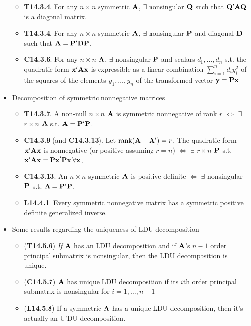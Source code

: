 \documentclass[a4paper, oneside]{book}
\begin{document}
\begin{itemize}
	\begin{itemize}
	\item \textbf{T14.3.4}. For any $n\times n$ symmetric $\mathbf{A}$, $\exists$ nonsingular $\mathbf{Q}$ such that $\mathbf{Q'AQ}$ is a diagonal matrix.
	\item \textbf{T14.3.4}. For any $n\times n$ symmetric $\mathbf{A}$, $\exists$ nonsingular $\mathbf{P}$ and diagonal $\mathbf{D}$ such that $\mathbf{A}=\mathbf{P'DP}$.
	\item \textbf{C14.3.6}. For any $n\times n$ $\mathbf{A}$, $\exists$ nonsingular $\mathbf{P}$ and scalars $d_1, \hdots, d_n$ s.t. the quadratic form $\mathbf{x'Ax}$ is expressible as a linear combination $\sum_{i=1}^n d_i y_i^2$ of the squares of the elements $y_1, \hdots, y_n$ of the transformed vector $\mathbf{y=Px}$
	\end{itemize}
\item Decomposition of symmetric nonnegative matrices
	\begin{itemize}
	\item \textbf{T14.3.7}. A non-null $n\times n$ $\mathbf{A}$ is symmetric nonnegative of rank $r$ $\iff$ $\exists$ $r\times n$ $\mathbf{A}$ s.t. $\mathbf{A}=\mathbf{P'P}$.
	\item \textbf{C14.3.9} (and \textbf{C14.3.13}). Let $\text{rank}(\mathbf{A+A'}) = r$. The quadratic form $\mathbf{x'Ax}$ is nonnegative (or positive assuming $r=n$) $\iff$ $\exists$ $r\times n$ $\mathbf{P}$ s.t. $\mathbf{x'Ax}=\mathbf{Px}'\mathbf{Px}\, \forall \mathbf{x}$. 
	\item \textbf{C14.3.13}. An $n\times n$  symmetric $\mathbf A$ is positive definite $\iff$ $\exists$ nonsingular $\mathbf{P}$ s.t. $\mathbf{A=P'P}$.
	\item \textbf{L14.4.1}. Every symmetric nonnegative matrix has a symmetric positive definite generalized inverse.
	\end{itemize}
\item Some results regarding the uniqueness of LDU decomposition
	\begin{itemize}
	\item (\textbf{T14.5.6}) \textit{If} $\mathbf{A}$ has an LDU decomposition and if $\mathbf{A}$'s $n-1$ order principal submatrix is nonsingular, then the LDU decomposition is unique.
	\item (\textbf{C14.5.7}) $\mathbf{A}$ has unique LDU decomposition if its $i$th order principal submatrix is nonsingular for $i=1,\hdots, n-1$
	\item (\textbf{L14.5.8}) If a symmetric $\mathbf A$ has a unique LDU decomposition, then it's actually an U'DU decomposition.
	\end{itemize}

\end{itemize}
\end{document}
